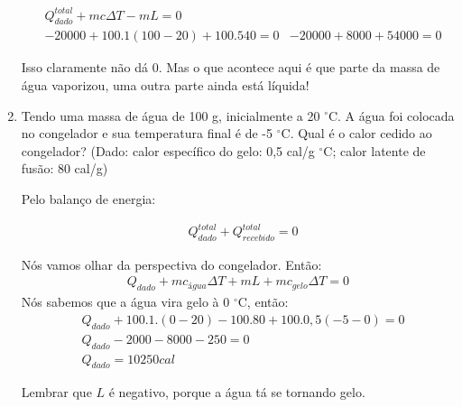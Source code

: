 \documentclass[12pt]{extarticle}
\newcommand{\<}{\langle}
\renewcommand{\>}{\rangle}
\theoremstyle{definition}
\newcommand{\grad}{$^\circ$}
\begin{document}
\begin{enumerate}
        \begin{align*}
            &Q_{dado}^{total} + mc\Delta T - mL =0\\
            &-20000 + 100.1(100-20) + 100.540 =0
            &-20000 + 8000 +54000 =0
        \end{align*}
        
        Isso claramente não dá 0. Mas o que acontece aqui é que parte da massa de água vaporizou, uma outra parte ainda está líquida!
        
        \item Tendo uma massa de água de 100 g, inicialmente a 20 \grad C. A água foi colocada no congelador e sua temperatura final é de -5 \grad C. Qual é o calor cedido ao congelador? (Dado: calor específico do gelo: 0,5 cal/g \grad C; calor latente de fusão: 80 cal/g)
        
        Pelo balanço de energia:
        
        \begin{align*}
            &Q_{dado}^{total} + Q_{recebido}^{total} =0
        \end{align*}
        
        Nós vamos olhar da perspectiva do congelador. Então:
        \begin{align*}
             Q_{dado} + mc_{água}\Delta T + mL + mc_{gelo}\Delta T =0
        \end{align*}
        Nós sabemos que a água vira gelo à 0 \grad C, então:
        \begin{align*}
            &Q_{dado} + 100.1.(0-20) - 100.80 + 100.0,5 (-5-0) =0\\
            &Q_{dado} -2000 - 8000 -250 =0\\
            &Q_{dado} = 10250 cal
        \end{align*}
        
        Lembrar que $L$ é negativo, porque a água tá se tornando gelo.
\end{enumerate}
\end{document}
